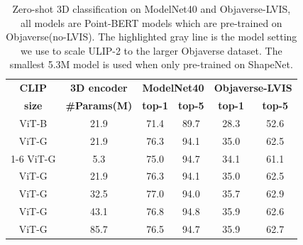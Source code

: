 \documentclass[10pt,twocolumn,letterpaper]{article}
\begin{document}
\begin{table}[h]
    \small
    \centering
    \vspace{-2mm}
    \begin{tabular}{cccccc}
         \toprule
        \textbf{CLIP} &\textbf{3D encoder }  & \multicolumn{2}{c}{\textbf{ModelNet40}} & \multicolumn{2}{c}{\textbf{Objaverse-LVIS}}\\
        \textbf{size} & \textbf{\#Params(M)} & \textbf{top-1} & \textbf{top-5}  & \textbf{top-1} &\textbf{top-5}  \\
         \midrule
         ViT-B  & 21.9 & 71.4  & 89.7 & 28.3 & 52.6 \\
         ViT-G & 21.9 & 76.3 & 94.1 & 35.0 & 62.5 \\
         \cmidrule{1-6}
          ViT-G & 5.3 & 75.0 & 94.7 & 34.1 & 61.1  \\
          ViT-G & 21.9 & 76.3 & 94.1 & 35.0 & 62.5  \\
          \rowcolor{gray!25} ViT-G & 32.5  & 77.0 & 94.0 & 35.7 & 62.9  \\
          ViT-G & 43.1  & 76.8 & 94.8  & 35.9 & 62.6  \\
          ViT-G & 85.7  & 76.5 & 94.7  & 35.9 & 62.7  \\

         
         \bottomrule
    \end{tabular}
    \caption{Zero-shot 3D classification on ModelNet40 and Objaverse-LVIS, all models are Point-BERT models which are pre-trained on Objaverse(no-LVIS). The highlighted gray line is the model setting we use to scale ULIP-2 to the larger Objaverse dataset. The smallest 5.3M model is used when only pre-trained on ShapeNet.}
    \label{tab:ablate_scale_up}
    \vspace{-4mm}
\end{table}




         
\end{document}
